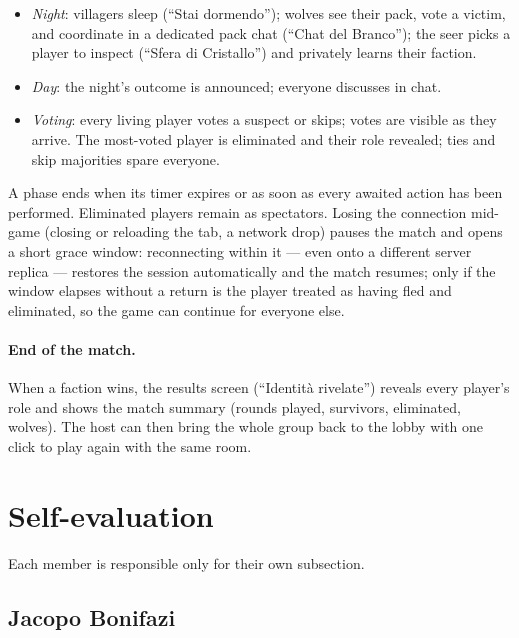 \documentclass{scrartcl}
\begin{document}
\begin{itemize}
  \item \emph{Night}: villagers sleep (``Stai dormendo''); wolves see
  their pack, vote a victim, and coordinate in a dedicated pack chat
  (``Chat del Branco''); the seer picks a player to inspect
  (``Sfera di Cristallo'') and privately learns their faction.
  \item \emph{Day}: the night's outcome is announced; everyone
  discusses in chat.
  \item \emph{Voting}: every living player votes a suspect or skips;
  votes are visible as they arrive. The most-voted player is eliminated
  and their role revealed; ties and skip majorities spare everyone.
\end{itemize}

A phase ends when its timer expires or as soon as every awaited action
has been performed. Eliminated players remain as spectators. Losing the
connection mid-game (closing or reloading the tab, a network drop) pauses
the match and opens a short grace window: reconnecting within it --- even
onto a different server replica --- restores the session automatically and
the match resumes; only if the window elapses without a return is the
player treated as having fled and eliminated, so the game can continue for
everyone else.

\paragraph{End of the match.}
When a faction wins, the results screen (``Identità rivelate'') reveals
every player's role and shows the match summary (rounds played,
survivors, eliminated, wolves). The host can then bring the whole group
back to the lobby with one click to play again with the same room.


\section{Self-evaluation}\label{self-evaluation}

Each member is responsible only for their own subsection.

\subsection{Jacopo Bonifazi}
\end{document}
